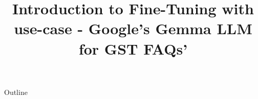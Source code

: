 \documentclass[xcolor=dvipsnames,compress,t,pdf,9pt]{beamer}
\title[\insertframenumber /\inserttotalframenumber]{Introduction to Fine-Tuning with use-case  -  Google's Gemma LLM for GST FAQs'}
\begin{document}
	\begin{frame}
	\titlepage
	\end{frame}
	
	\begin{frame}{Outline}
	    \tableofcontents
	\end{frame}

%	
	
	
\end{document}
